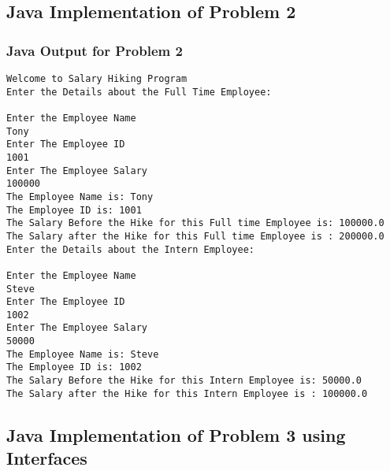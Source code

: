 \documentclass[11pt]{article}
\begin{document}
\subsection{Java Implementation of Problem 2}






\subsubsection{Java Output for Problem 2}
\begin{lstlisting}[caption=Java Output for Problem 2]
Welcome to Salary Hiking Program
Enter the Details about the Full Time Employee:

Enter the Employee Name
Tony
Enter The Employee ID
1001
Enter The Employee Salary
100000
The Employee Name is: Tony
The Employee ID is: 1001
The Salary Before the Hike for this Full time Employee is: 100000.0
The Salary after the Hike for this Full time Employee is : 200000.0
Enter the Details about the Intern Employee:

Enter the Employee Name
Steve
Enter The Employee ID
1002
Enter The Employee Salary
50000
The Employee Name is: Steve
The Employee ID is: 1002
The Salary Before the Hike for this Intern Employee is: 50000.0
The Salary after the Hike for this Intern Employee is : 100000.0
\end{lstlisting}

\subsection{Java Implementation of Problem 3 using Interfaces}





\end{document}
